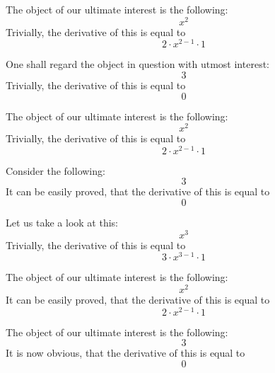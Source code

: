 \documentclass{article}
\begin{document}
The object of our ultimate interest is the following:
\begin{equation}
x ^{2 } 
\end{equation}
Trivially, the derivative of this is equal to
\begin{equation}
2 \cdot x ^{2 - 1 } \cdot 1 
\end{equation}

One shall regard the object in question with utmost interest:
\begin{equation}
3 
\end{equation}
Trivially, the derivative of this is equal to
\begin{equation}
0 
\end{equation}

The object of our ultimate interest is the following:
\begin{equation}
x ^{2 } 
\end{equation}
Trivially, the derivative of this is equal to
\begin{equation}
2 \cdot x ^{2 - 1 } \cdot 1 
\end{equation}

Consider the following:
\begin{equation}
3 
\end{equation}
It can be easily proved, that the derivative of this is equal to
\begin{equation}
0 
\end{equation}

Let us take a look at this:
\begin{equation}
x ^{3 } 
\end{equation}
Trivially, the derivative of this is equal to
\begin{equation}
3 \cdot x ^{3 - 1 } \cdot 1 
\end{equation}

The object of our ultimate interest is the following:
\begin{equation}
x ^{2 } 
\end{equation}
It can be easily proved, that the derivative of this is equal to
\begin{equation}
2 \cdot x ^{2 - 1 } \cdot 1 
\end{equation}

The object of our ultimate interest is the following:
\begin{equation}
3 
\end{equation}
It is now obvious, that the derivative of this is equal to
\begin{equation}
0 
\end{equation}
\end{document}
